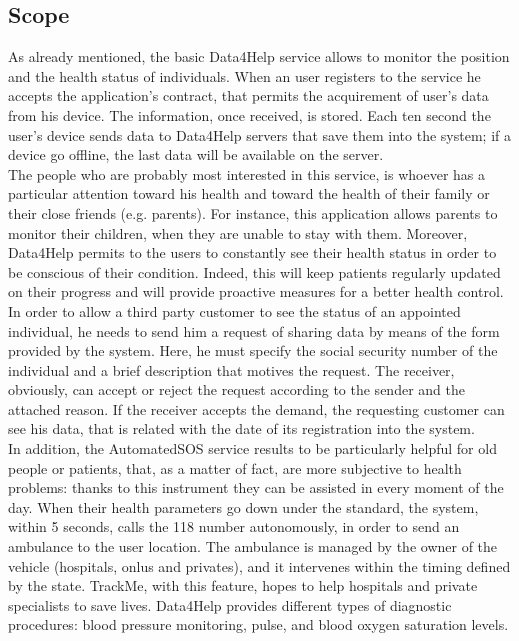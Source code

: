 \subsection{Scope}
As already mentioned, the basic Data4Help service allows to monitor the position and the health status of individuals. When an user registers to the service he accepts the application's contract, that permits the acquirement of user's data from his device. The information, once received, is stored. 
Each ten second the user's device sends data to Data4Help servers that save them into the system; if a device go offline, the last data will be available on the server.\\ 
The people who are probably most interested in this service, is whoever has a particular attention toward his health and toward the health of their family or their close friends (e.g. parents).
For instance, this application allows parents to monitor their children, when they are unable to stay with them. 
Moreover, Data4Help permits to the users to constantly see their health status in order to be conscious of their condition. Indeed, this will keep patients regularly updated on their progress and will provide proactive measures for a better health control. 
In order to allow a third party customer to see the status of an appointed individual, he needs to send him a request of sharing data by means of the form provided by the system. 
Here, he must specify the social security number of the individual and a brief description that motives the request. 
The receiver, obviously, can accept or reject the request according to the sender and the attached reason. 
If the receiver accepts the demand, the requesting customer can see his data, that is related with the date of its registration into the system. \\ 
In addition, the AutomatedSOS service results to be particularly helpful for old people or patients, that, as a matter of fact, are more subjective to health problems: thanks to this instrument they can be assisted in every moment of the day. 
When their health parameters go down under the standard, the system, within 5 seconds, calls the 118 number autonomously, in order to send an ambulance to the user location. 
The ambulance is managed by the owner of the vehicle (hospitals, onlus and privates), and it intervenes within the timing defined by the state.
TrackMe, with this feature, hopes to help hospitals and private specialists to save lives.
Data4Help provides different types of diagnostic procedures: blood pressure monitoring, pulse, and blood oxygen saturation levels.\\ 
